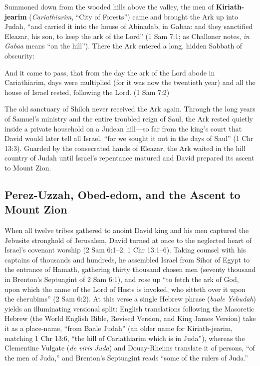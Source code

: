 Summoned down from the wooded hills above the valley, the men of \textbf{Kiriath-jearim} (\textit{Cariathiarim}, ``City of Forests'') came and brought the Ark up into Judah, ``and carried it into the house of Abinadab, in Gabaa: and they sanctified Eleazar, his son, to keep the ark of the Lord'' (1 Sam 7:1; as Challoner notes, \textit{in Gabaa} means ``on the hill''). There the Ark entered a long, hidden Sabbath of obscurity:

\begin{scriptureblock}
And it came to pass, that from the day the ark of the Lord abode in Cariathiarim, days were multiplied (for it was now the twentieth year) and all the house of Israel rested, following the Lord. \textnormal{(1 Sam 7:2)}
\end{scriptureblock}

The old sanctuary of Shiloh never received the Ark again. Through the long years of Samuel's ministry and the entire troubled reign of Saul, the Ark rested quietly inside a private household on a Judean hill---so far from the king's court that David would later tell all Israel, ``for we sought it not in the days of Saul'' (1 Chr 13:3). Guarded by the consecrated hands of Eleazar, the Ark waited in the hill country of Judah until Israel's repentance matured and David prepared its ascent to Mount Zion.

\subsection{Perez-Uzzah, Obed-edom, and the Ascent to Mount Zion}

When all twelve tribes gathered to anoint David king and his men captured the Jebusite stronghold of Jerusalem, David turned at once to the neglected heart of Israel's covenant worship (2 Sam 6:1--2; 1 Chr 13:1--6). Taking counsel with his captains of thousands and hundreds, he assembled Israel from Sihor of Egypt to the entrance of Hamath, gathering thirty thousand chosen men (seventy thousand in Brenton's Septuagint of 2 Sam 6:1), and rose up ``to fetch the ark of God, upon which the name of the Lord of Hosts is invoked, who sitteth over it upon the cherubims'' (2 Sam 6:2). At this verse a single Hebrew phrase (\textit{baale Yehudah}) yields an illuminating versional split: English translations following the Masoretic Hebrew (the World English Bible, Revised Version, and King James Version) take it as a place-name, ``from Baale Judah'' (an older name for Kiriath-jearim, matching 1 Chr 13:6, ``the hill of Cariathiarim which is in Juda''), whereas the Clementine Vulgate (\textit{de viris Juda}) and Douay-Rheims translate it of persons, ``of the men of Juda,'' and Brenton's Septuagint reads ``some of the rulers of Juda.''

